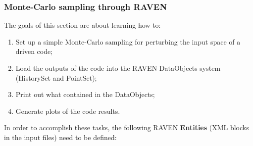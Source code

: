 \subsubsection{Monte-Carlo sampling through RAVEN}
\label{subsub:MCexample}
The goals of this section are about learning how to:
 \begin{enumerate}
   \item Set up a simple Monte-Carlo sampling for perturbing the input 
   space of a driven code;
   \item Load the outputs of the code into the RAVEN DataObjects 
   system (HistorySet and PointSet);
   \item Print out what contained in the DataObjects;
   \item Generate plots of the code results.
\end{enumerate}  
In order to accomplish these tasks, the following RAVEN \textbf{Entities} (XML blocks in the input files) need to be defined:
